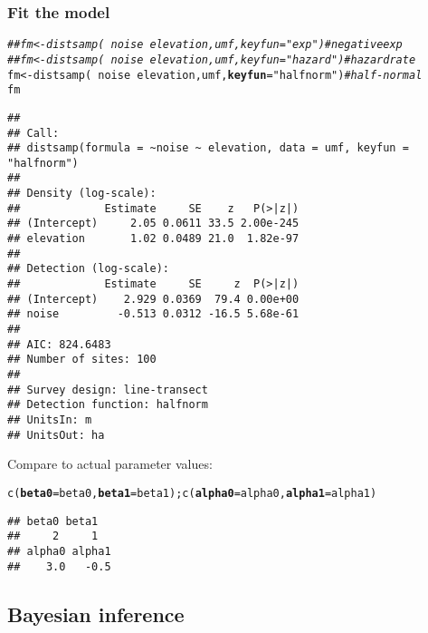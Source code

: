 \documentclass[color=usenames,dvipsnames]{beamer}\usepackage[]{graphicx}\usepackage[]{xcolor}
\makeatletter
\newcommand{\hlsng}[1]{\textcolor[rgb]{0.749,0.012,0.012}{#1}}%
\newcommand{\hlcom}[1]{\textcolor[rgb]{0.514,0.506,0.514}{\textit{#1}}}%
\newcommand{\hlopt}[1]{\textcolor[rgb]{0,0,0}{#1}}%
\newcommand{\hldef}[1]{\textcolor[rgb]{0,0,0}{#1}}%
\newcommand{\hlkwb}[1]{\textcolor[rgb]{0,0.341,0.682}{#1}}%
\newcommand{\hlkwc}[1]{\textcolor[rgb]{0,0,0}{\textbf{#1}}}%
\newcommand{\hlkwd}[1]{\textcolor[rgb]{0.004,0.004,0.506}{#1}}%
\newenvironment{kframe}{%
 \def\at@end@of@kframe{}%
 \ifinner\ifhmode%
  \def\at@end@of@kframe{\end{minipage}}%
  \begin{minipage}{\columnwidth}%
 \fi\fi%
 \def\FrameCommand##1{\hskip\@totalleftmargin \hskip-\fboxsep
 \colorbox{shadecolor}{##1}\hskip-\fboxsep
     \hskip-\linewidth \hskip-\@totalleftmargin \hskip\columnwidth}%
 \MakeFramed {\advance\hsize-\width
   \@totalleftmargin\z@ \linewidth\hsize
   \@setminipage}}%
 {\par\unskip\endMakeFramed%
 \at@end@of@kframe}
\newenvironment{knitrout}{}{} %
\makeatother
\begin{document}
\begin{frame}[fragile]
  \frametitle{Fit the model}
  \footnotesize
\begin{knitrout}\tiny
{}\color{fgcolor}\begin{kframe}
\begin{alltt}
\hlcom{## fm <- distsamp(~noise ~elevation, umf, keyfun="exp")     # negative exp}
\hlcom{## fm <- distsamp(~noise ~elevation, umf, keyfun="hazard")  # hazard rate}
\hldef{fm} \hlkwb{<-} \hlkwd{distsamp}\hldef{(}\hlopt{~}\hldef{noise} \hlopt{~}\hldef{elevation, umf,} \hlkwc{keyfun}\hldef{=}\hlsng{"halfnorm"}\hldef{)}   \hlcom{# half-normal}
\hldef{fm}
\end{alltt}
\begin{verbatim}
## 
## Call:
## distsamp(formula = ~noise ~ elevation, data = umf, keyfun = "halfnorm")
## 
## Density (log-scale):
##             Estimate     SE    z   P(>|z|)
## (Intercept)     2.05 0.0611 33.5 2.00e-245
## elevation       1.02 0.0489 21.0  1.82e-97
## 
## Detection (log-scale):
##             Estimate     SE     z  P(>|z|)
## (Intercept)    2.929 0.0369  79.4 0.00e+00
## noise         -0.513 0.0312 -16.5 5.68e-61
## 
## AIC: 824.6483 
## Number of sites: 100
## 
## Survey design: line-transect
## Detection function: halfnorm
## UnitsIn: m
## UnitsOut: ha
\end{verbatim}
\end{kframe}
\end{knitrout}
\pause
\vfill
Compare to actual parameter values:
\vspace{-6pt}
\begin{knitrout}\tiny
{}\color{fgcolor}\begin{kframe}
\begin{alltt}
\hlkwd{c}\hldef{(}\hlkwc{beta0}\hldef{=beta0,} \hlkwc{beta1}\hldef{=beta1);} \hlkwd{c}\hldef{(}\hlkwc{alpha0}\hldef{=alpha0,} \hlkwc{alpha1}\hldef{=alpha1)}
\end{alltt}
\begin{verbatim}
## beta0 beta1 
##     2     1
## alpha0 alpha1 
##    3.0   -0.5
\end{verbatim}
\end{kframe}
\end{knitrout}
\end{frame}




\subsection{Bayesian inference}
\end{document}
